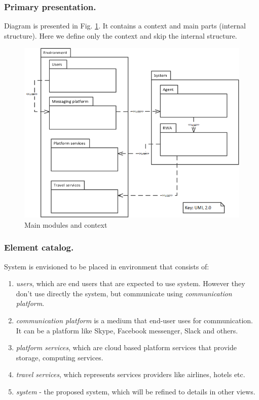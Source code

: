 \documentclass{llncs}
\begin{document}
\subsubsection{Primary presentation.} Diagram is presented in Fig. \ref{fig:maincontext}. It contains a context and main parts (internal structure).  Here we define only the context and skip the internal structure.
\begin{figure}[t]
	\centering
	\includegraphics[width=\linewidth]{Images/BDIDecomposition.png}
	\caption{Main modules and context}	
	\label{fig:maincontext}
\end{figure}
\subsubsection{Element catalog.}
System is envisioned to be placed in environment that consists of: \begin{enumerate}
	\item \emph{users}, which are end users that are expected to use system. However they don't use directly the system, but communicate using \emph{communication platform}.
	\item \emph{communication platform} is a medium that end-user uses for communication. It can be a platform like Skype, Facebook messenger, Slack and others. 
	\item \emph{platform services}, which are cloud based platform services that provide storage, computing services.
	\item \emph{travel services}, which represents services providers like airlines, hotels etc.
	\item \emph{system} - the proposed system, which will be refined to details in other views. 
\end{enumerate}
\end{document}
